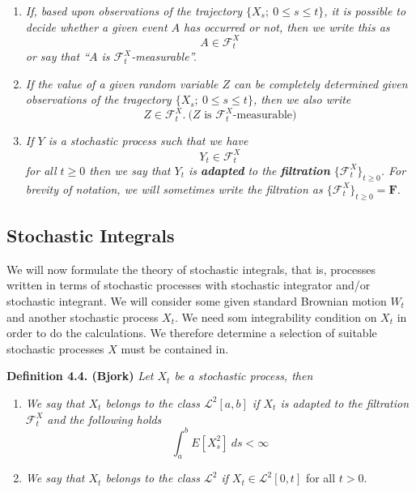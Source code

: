 \documentclass[a4paper,12pt,openany]{book}
\providecommand{\tightlist}{%
 \setlength{\itemsep}{0pt}\setlength{\parskip}{0pt}}
\begin{document}
\begin{enumerate}
\def\labelenumi{\arabic{enumi}.}
\tightlist
\item
  \emph{If, based upon observations of the trajectory \(\{X_s;\ 0\le s\le t\}\), it is possible to decide whether a given event \(A\) has occurred or not, then we write this as}
  \[
    A\in\mathcal{F}^X_t
    \]
  \emph{or say that ``\(A\) is \(\mathcal{F}^X_t\)-measurable''.}
\item
  \emph{If the value of a given random variable \(Z\) can be completely determined given observations of the tragectory \(\{X_s;\ 0\le s\le t\}\), then we also write}
  \[
    Z\in\mathcal{F}^X_t.\ \text{(}Z\text{ is }\mathcal{F}^X_t\text{-measurable)}
    \]
\item
  \emph{If \(Y\) is a stochastic process such that we have}
  \[
    Y_t\in\mathcal{F}^X_t
    \]
  \emph{for all \(t\ge0\) then we say that \(Y_t\) is \textbf{adapted} to the \textbf{filtration} \(\{\mathcal{F}^X_t\}_{t\ge 0}\). For brevity of notation, we will sometimes write the filtration as \(\{\mathcal{F}^X_t\}_{t\ge 0}=\mathbf{F}\).}
\end{enumerate}

\hypertarget{stochastic-integrals-1}{%
\subsection{Stochastic Integrals}\label{stochastic-integrals-1}}

We will now formulate the theory of stochastic integrals, that is, processes written in terms of stochastic processes with stochastic integrator and/or stochastic integrant. We will consider some given standard Brownian motion \(W_t\) and another stochastic process \(X_t\). We need som integrability condition on \(X_t\) in order to do the calculations. We therefore determine a selection of suitable stochastic processes \(X\) must be contained in.

\textbf{Definition 4.4. (Bjork)} \emph{Let \(X_t\) be a stochastic process, then}

\begin{enumerate}
\def\labelenumi{\roman{enumi}.}
\tightlist
\item
  \emph{We say that \(X_t\) belongs to the class \(\mathcal{L}^2[a,b]\) if \(X_t\) is adapted to the filtration \(\mathcal{F}^X_t\) and the following holds}
  \[\int_a^bE[X_s^2]\ ds<\infty\]
\item
  \emph{We say that \(X_t\) belongs to the class \(\mathcal{L}^2\) if} \(X_t\in\mathcal{L}^2[0,t]\) for all \(t>0\).
\end{enumerate}
\end{document}
